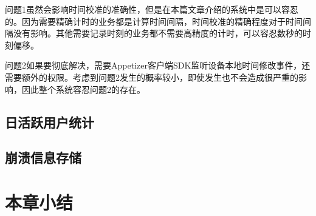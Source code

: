 问题1虽然会影响时间校准的准确性，但是在本篇文章介绍的系统中是可以容忍的。因为需要精确计时的业务都是计算时间间隔，时间校准的精确程度对于时间间隔没有影响。其他需要记录时刻的业务都不需要高精度的计时，可以容忍数秒的时刻偏移。

问题2如果要彻底解决，需要Appetizer客户端SDK监听设备本地时间修改事件，还需要额外的权限。考虑到问题2发生的概率较小，即使发生也不会造成很严重的影响，因此整个系统容忍问题2的存在。

\subsection{日活跃用户统计}



\subsection{崩溃信息存储}


\section{本章小结}

